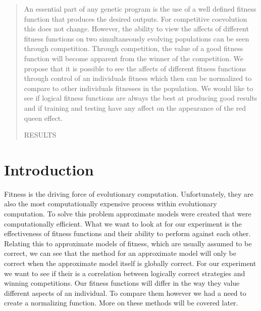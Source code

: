 \documentclass{acm_proc_article-sp}
\begin{document}

\maketitle
\begin{abstract}

An essential part of any genetic program is the use of a well defined fitness function that produces the desired outputs. For competitive coevolution this does not change. However, the ability to view the affects of different fitness functions on two simultaneously evolving populations can be seen through competition. Through competition, the value of a good fitness function will become apparent from the winner of the competition. We propose that it is possible to see the affects of different fitness functions through control of an individuals fitness which then can be normalized to compare to other individuals fitnesses in the population. We would like to see if logical fitness functions are always the best at producing good results and if training and testing have any affect on the appearance of the red queen effect.

RESULTS

\end{abstract}




\section{Introduction} %

Fitness is the driving force of evolutionary computation. Unfortunately, they are also the most computationally expensive process within evolutionary computation. To solve this problem approximate models were created that were computationally efficient\cite{Fitness}. What we want to look at for our experiment is the effectiveness of fitness functions and their ability to perform against each other. Relating this to approximate models of fitness, which are usually assumed to be correct\cite{Fitness}, we can see that the method for an approximate model will only be correct when the approximate model itself is globally correct. For our experiment we want to see if their is a correlation between logically correct strategies and winning competitions. Our fitness functions will differ in the way they value different aspects of an individual. To compare them however we had a need to create a normalizing function. More on these methods will be covered later. 
\end{document}
